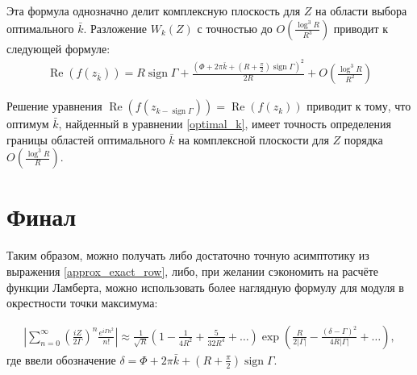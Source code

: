 \documentclass[a4paper, 12pt]{article}
\DeclareMathOperator*{\sign}{sign}
\DeclareMathOperator*{\Real}{Re}
\newenvironment{eqw}{\begin{equation} \begin{aligned}}   
    {\end{aligned}    \end{equation}}
\begin{document}
Эта формула однозначно делит комплексную плоскость для $Z$ на области выбора оптимального $\bar k$. Разложение $W_{k}(Z)$ с точностью до $O\left(\frac{\log^3 R}{R^3}\right)$ приводит к следующей формуле:
\begin{eqw}
    \Real(f(z_{\bar k})) =  R\sign \Gamma + \frac{\left(\Phi + 2\pi \bar k +  \left(R+\frac{\pi}{2} \right)\sign\Gamma\right)^2}{2R} +
     O\left(\frac{\log^3 R}{R^2}\right)
\end{eqw}

Решение уравнения $\Real(f(z_{k-\sign \Gamma})) = \Real(f(z_{k}))$ приводит к тому, что оптимум $\bar k$, найденный в уравнении \eqref{optimal_k}, имеет точность определения границы областей оптимального $\bar k$ на комплексной плоскости для $Z$ порядка $O\left(\frac{\log^3 R}{R}\right)$.

\section*{Финал}
Таким образом, можно получать либо достаточно точную асимптотику из выражения \eqref{approx_exact_row}, либо, при желании сэкономить на расчёте функции Ламберта, можно использовать более наглядную формулу для модуля в окрестности точки максимума:

\begin{eqw}
    \left|\sum\limits_{n=0}^{\infty}\left(\frac{iZ}{2\Gamma}\right)^n  \frac{e^{i\Gamma n^2}}{n!} \right|\approx 
    \frac{1}{\sqrt{R}}\left(1-\frac{1}{4 R^2} + \frac{5}{32 R^4}+\dots\right)
    \exp\left(\frac{R}{2|\Gamma|} - \frac{\left(\delta -\Gamma\right)^2}{4R|\Gamma|}+\dots\right),
\end{eqw}
где ввели обозначение $\delta = \Phi + 2\pi \bar k +  \left(R+\frac{\pi}{2} \right)\sign\Gamma$.


\nocite{*}

\end{document}

